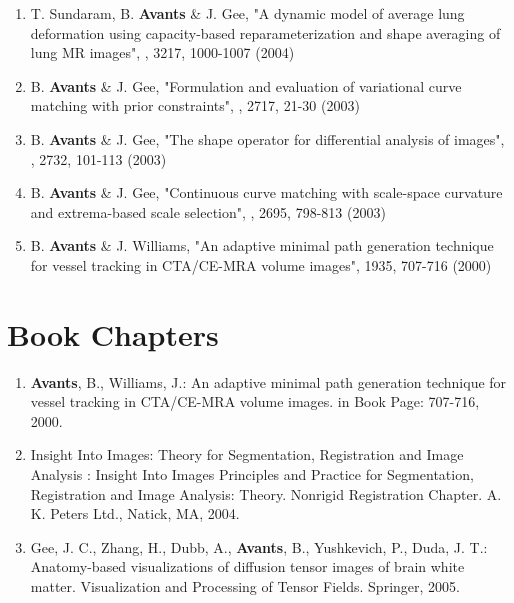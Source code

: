 \documentclass[11pt]{moderncv} %
\begin{document}
\begin{enumerate}
\item T. Sundaram, B. \textbf{Avants} \&  J. Gee, 
"A dynamic model of average lung deformation using capacity-based reparameterization and shape averaging of lung MR images", 
, 3217, 1000-1007 (2004)
\item B. \textbf{Avants} \&  J. Gee, 
"Formulation and evaluation of variational curve matching with prior constraints", 
, 2717, 21-30 (2003)
\item B. \textbf{Avants} \&  J. Gee, 
"The shape operator for differential analysis of images", , 2732, 101-113 (2003)
\item B. \textbf{Avants} \&  J. Gee, 
"Continuous curve matching with scale-space curvature and extrema-based scale selection", 
, 2695, 798-813 (2003)
\item B. \textbf{Avants} \&  J. Williams,
"An adaptive minimal path generation technique for vessel tracking in
CTA/CE-MRA volume images", 1935, 707-716 (2000)
\end{enumerate}

\section{Book Chapters}
\begin{enumerate}
\item \textbf{Avants}, B., Williams, J.: An adaptive minimal path generation technique for vessel tracking in CTA/CE-MRA volume images. in Book Page: 707-716, 2000.
\item Insight Into Images: Theory for Segmentation, Registration and Image Analysis :
Insight Into Images Principles and Practice for Segmentation, Registration and Image Analysis: Theory. Nonrigid Registration Chapter. A. K. Peters Ltd., Natick, MA, 2004.
\item Gee, J. C., Zhang, H., Dubb, A., \textbf{Avants}, B., Yushkevich, P., Duda, J. T.: Anatomy-based visualizations of diffusion tensor images of brain white matter. Visualization and Processing of Tensor Fields. Springer, 2005.
\end{enumerate}

\end{document}
